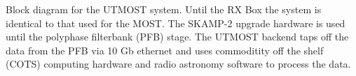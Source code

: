 Block diagram for the UTMOST system. Until the RX Box the system is identical to that used for the MOST. The SKAMP-2 upgrade hardware is used until the polyphase filterbank (PFB) stage. The UTMOST backend taps off the data from the PFB via 10 Gb ethernet and uses commoditity off the shelf (COTS) computing hardware and radio astronomy software to process the data.
  